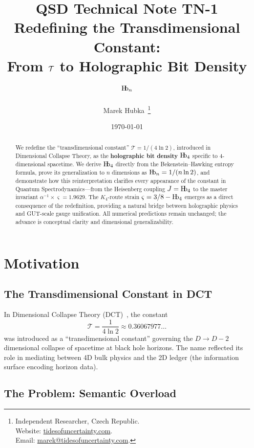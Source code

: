 \documentclass[11pt,a4paper]{article}
\title{
  \textbf{QSD Technical Note TN-1}\\[0.5em]
  \Large Redefining the Transdimensional Constant:\\
From $\Tc$ to Holographic Bit Density $\Hbn$\\[1em]
}
\author{
  Marek Hubka\, \orcidlink{0009-0003-2476-9017}
  \thanks{
    Independent Researcher, Czech Republic.\\
    Website: \href{http://www.tidesofuncertainty.com}{tidesofuncertainty.com}.\\
    Email: \href{mailto:marek@tidesofuncertainty.com}{marek@tidesofuncertainty.com}.
  }
}
\date{\today}
\theoremstyle{plain}
\theoremstyle{definition}
\newcommand{\Hb}{\textnormal{H\kern-0.3em b}}
\newcommand{\Hbn}{\Hb_n}
\newcommand{\Hbfour}{\Hb_4}
\newcommand{\Tc}{\mathcal{T}}
\newcommand{\strain}{\varsigma}
\begin{document}
\maketitle

\begin{abstract}
\noindent We redefine the ``transdimensional constant'' $\Tc = 1/(4\ln 2)$, introduced in Dimensional Collapse Theory, as the \textbf{holographic bit density} $\Hbfour$ specific to 4-dimensional spacetime. We derive $\Hbfour$ directly from the Bekenstein--Hawking entropy formula, prove its generalization to $n$ dimensions as $\Hbn = 1/(n\ln 2)$, and demonstrate how this reinterpretation clarifies every appearance of the constant in Quantum Spectrodynamics---from the Heisenberg coupling $J = \Hbfour$ to the master invariant $\alpha^{-1} \times \strain = 1.9629$. The $K_4$-route strain $\strain = 3/8 - \Hbfour$ emerges as a direct consequence of the redefinition, providing a natural bridge between holographic physics and GUT-scale gauge unification. All numerical predictions remain unchanged; the advance is conceptual clarity and dimensional generalizability.
\end{abstract}

\tableofcontents

\section{Motivation}
\label{sec:motivation}

\subsection{The Transdimensional Constant in DCT}

In Dimensional Collapse Theory (DCT)~\cite{Hubka2025DCT}, the constant
\begin{equation}
\Tc = \frac{1}{4\ln 2} \approx 0.36067977\ldots
\label{eq:Tc_def}
\end{equation}
was introduced as a ``transdimensional constant'' governing the $D \to D-2$ dimensional collapse of spacetime at black hole horizons. The name reflected its role in mediating between 4D bulk physics and the 2D ledger (the information surface encoding horizon data).

\subsection{The Problem: Semantic Overload}
\end{document}
